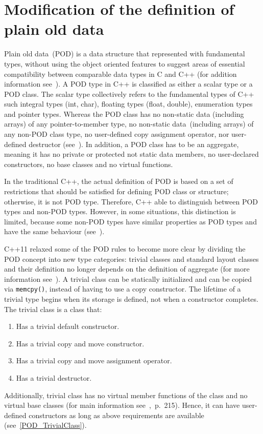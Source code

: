 \documentclass[11pt]{report}
\begin{document}
\section{Modification of the definition of plain old data}
\label{section: Modification of the definition of plain old data}
Plain old data~(POD) is a data structure that represented with fundamental types, without using the object oriented features to suggest areas of essential compatibility between comparable data types in C and C++ (for addition information see~\cite{Stroustrup:2012:Cpp11}). A POD type in C++ is classified as either a scalar type or a POD class. The scalar type collectively refers to the fundamental types of C++ such integral types (int, char), floating types (float, double), enumeration types and pointer types. Whereas the POD class has no non-static data (including arrays) of any pointer-to-member type, no non-static data~(including arrays) of any non-POD class type, no user-defined copy assignment operator, nor user-defined destructor (see~\cite{MSDN:2012:CppModern}). In addition, a POD class has to be an aggregate, meaning it has no private or protected not static data members, no user-declared constructors, no base classes and no virtual functions.

In the traditional C++, the actual definition of POD is based on a set of restrictions that should be satisfied for defining POD class or structure; otherwise, it is not POD type. Therefore, C++ able to distinguish between POD types and non-POD types. However, in some situations, this distinction is limited, because some non-POD types have similar properties as POD types and have the same behaviour (see~\cite{Stroustrup:2012:Cpp11}).

C++11 relaxed some of the POD rules to become more clear by dividing the POD concept into new type categories: trivial classes and standard layout classes and their definition no longer depends on the definition of aggregate (for more information see~\cite{MSDN:2012:CppModern}). A trivial class can be statically initialized and can be copied via \texttt{memcpy()}, instead of having to use a copy constructor. The lifetime of a trivial type begins when its storage is defined, not when a constructor completes. The trivial class is a class that:
\begin{enumerate}
\item	Has a trivial default constructor. 
\item	Has a trivial copy and move constructor.
\item	Has a trivial copy and move assignment operator.
\item	Has a trivial destructor.
\end{enumerate}
Additionally, trivial class has no virtual member functions of the class and no virtual base classes (for main information see~\cite{ISO:2011:Cpplanguage},~p.~215). Hence, it can have user-defined constructors as long as above requirements are available (see~\ref{POD_TrivialClass}).
\end{document}
